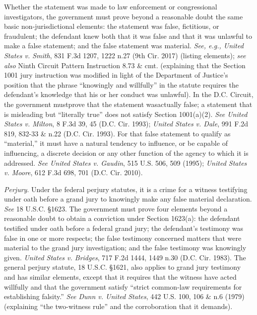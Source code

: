 Whether the statement was made to law enforcement or congressional investigators, the government must prove beyond a reasonable doubt the same basic non-jurisdictional elements: the statement was false, fictitious, or fraudulent; the defendant knew both that it was false and that it was unlawful to make a false statement; and the false statement was material. 
\textit{See, e.g., United States v. Smith}, 831 F.3d 1207, 1222 n.27 (9th Cir. 2017) (listing elements); \textit{see also} Ninth Circuit Pattern Instruction 8.73 \& cmt. (explaining that the Section 1001 jury instruction was modified in light of the Department of Justice's position that the phrase ``knowingly and willfully'' in the statute requires the defendant's knowledge that his or her conduct was unlawful). 
In the D.C. Circuit, the government mustprove that the statement wasactually false; a statement that is misleading but ``literally true'' does not satisfy Section 1001(a)(2). 
\textit{See United States v. Milton}, 8 F.3d 39, 45 (D.C. Cir. 1993); \textit{United States v. Dale}, 991 F.2d 819, 832-33 \& n.22 (D.C. Cir. 1993). 
For that false statement to qualify as ``material,'' it must have a natural tendency to influence, or be capable of influencing, a discrete decision or any other function of the agency to which it is addressed. 
\textit{See United States v. Gaudin}, 515 U.S. 506, 509 (1995); \textit{United States v. Moore}, 612 F.3d 698, 701 (D.C. Cir. 2010).

\textit{Perjury}. 
Under the federal perjury statutes, it is a crime for a witness testifying under oath before a grand jury to knowingly make any false material declaration. 
\textit{See} 18 U.S.C. \S 1623. 
The government must prove four elements beyond a reasonable doubt to obtain a conviction under Section 1623(a): the defendant testified under oath before a federal grand jury; the defendant's testimony was false in one or more respects; the false testimony concerned matters that were material to the grand jury investigation; and the false testimony was knowingly given. 
\textit{United States v. Bridges}, 717 F.2d 1444, 1449 n.30 (D.C. Cir. 1983). 
The general perjury statute, 18 U.S.C. \S 1621, also applies to grand jury testimony and has similar elements, except that it requires that the witness have acted willfully and that the government satisfy ``strict common-law requirements for establishing falsity.''
\textit{See Dunn v. United States}, 442 U.S. 100, 106 \& n.6 (1979) (explaining ``the two-witness rule'' and the corroboration that it demands).

